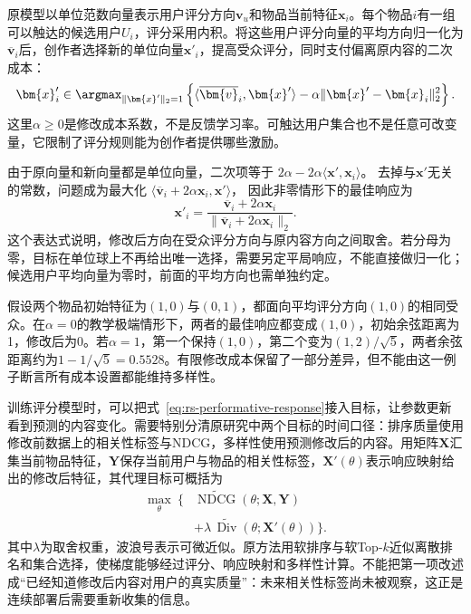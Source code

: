 原模型以单位范数向量表示用户评分方向$\bm{v}_u$和物品当前特征$\bm{x}_i$。每个物品$i$有一组可以触达的候选用户$U_i$，评分采用内积。将这些用户评分向量的平均方向归一化为$\overline{\bm{v}}_i$后，创作者选择新的单位向量$\bm{x}'_i$，提高受众评分，同时支付偏离原内容的二次成本：
\begin{equation}
 \bm{x}'_i\in
 \argmax_{\lVert\bm{x}'\rVert_2=1}
 \left\{\langle\overline{\bm{v}}_i,\bm{x}'\rangle
       -\alpha\lVert\bm{x}'-\bm{x}_i\rVert_2^2\right\}.
 \label{eq:rs-performative-response-objective}
\end{equation}
这里$\alpha\geq0$是修改成本系数，不是反馈学习率。可触达用户集合也不是任意可改变量，它限制了评分规则能为创作者提供哪些激励。

由于原向量和新向量都是单位向量，二次项等于
$2\alpha-2\alpha\langle\bm{x}',\bm{x}_i\rangle$。
去掉与$\bm{x}'$无关的常数，问题成为最大化
$\langle\overline{\bm{v}}_i+2\alpha\bm{x}_i,\bm{x}'\rangle$，
因此非零情形下的最佳响应为
\begin{equation}
 \bm{x}'_i=
 \frac{\overline{\bm{v}}_i+2\alpha\bm{x}_i}
      {\lVert\overline{\bm{v}}_i+2\alpha\bm{x}_i\rVert_2}.
 \label{eq:rs-performative-response}
\end{equation}
这个表达式说明，修改后方向在受众评分方向与原内容方向之间取舍。若分母为零，目标在单位球上不再给出唯一选择，需要另定平局响应，不能直接做归一化；候选用户平均向量为零时，前面的平均方向也需单独约定。

假设两个物品初始特征为$(1,0)$与$(0,1)$，都面向平均评分方向$(1,0)$的相同受众。在$\alpha=0$的教学极端情形下，两者的最佳响应都变成$(1,0)$，初始余弦距离为1，修改后为0。若$\alpha=1$，第一个保持$(1,0)$，第二个变为$(1,2)/\sqrt5$，两者余弦距离约为$1-1/\sqrt5=0.5528$。有限修改成本保留了一部分差异，但不能由这一例子断言所有成本设置都能维持多样性。

训练评分模型时，可以把式~\eqref{eq:rs-performative-response}接入目标，让参数更新看到预测的内容变化。需要特别分清原研究中两个目标的时间口径：排序质量使用修改前数据上的相关性标签与NDCG，多样性使用预测修改后的内容。用矩阵$\bm{X}$汇集当前物品特征，$\bm{Y}$保存当前用户与物品的相关性标签，$\bm{X}'(\theta)$表示响应映射给出的修改后特征，其代理目标可概括为
\begin{equation}
 \begin{aligned}
 \max_\theta\ \bigl\{&
 \widetilde{\operatorname{NDCG}}(\theta;\bm{X},\bm{Y})\\
 &+\lambda\,\widetilde{\operatorname{Div}}
       (\theta;\bm{X}'(\theta))\bigr\}.
 \end{aligned}
 \label{eq:rs-performative-learning}
\end{equation}
其中$\lambda$为取舍权重，波浪号表示可微近似。原方法用软排序与软Top-$k$近似离散排名和集合选择，使梯度能够经过评分、响应映射和多样性计算。不能把第一项改述成“已经知道修改后内容对用户的真实质量”：未来相关性标签尚未被观察，这正是连续部署后需要重新收集的信息。

